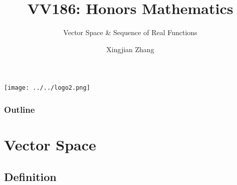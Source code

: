 \documentclass[10pt, t]{beamer}
\title{VV186: Honors Mathematics}
\subtitle{Vector Space \& Sequence of Real Functions}
\institute[UM-SJTU JI]{Univerity of Michigan-Shanghai Jiao Tong University Joint Institute}
\author{Xingjian Zhang}
\begin{document}
\begin{frame}
    \titlepage
    \begin{center}
        \texttt{[image: ../../logo2.png]}
    \end{center}
\end{frame}

\begin{frame}
    \frametitle{Outline}
    \begin{spacing}{1}
        \tableofcontents
    \end{spacing}
\end{frame}

\section{Vector Space}
\subsection{Definition}
\end{document}
